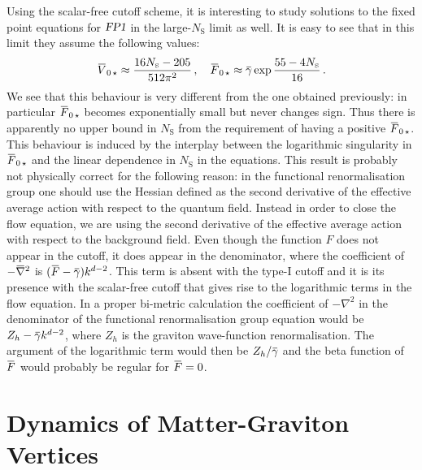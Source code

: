\documentclass[11pt]{book} %
\newcommand{\overbar}[1]{\mkern 1.5mu\overline{\mkern-1.5mu#1\mkern-1.5mu}\mkern 1.5mu}
\newcommand\NS{ N_{\scriptscriptstyle{\mathrm{S}}} }
\newcommand{\bnabla}{\overbar \nabla}
\newcommand{\FPone}  {\textsl{FP1}}
\newcommand{\bV}{\overbar V}
\newcommand{\bF}{\overbar F}
\newcommand{\bg}{\overbar \gamma}
\numberwithin{equation}{chapter}
\begin{document}
Using the scalar-free cutoff scheme, it is interesting to study solutions to
the fixed point equations for $\FPone$ in the large-$\NS$ limit as well.
It is easy to see that in this limit they assume the following values:
\begin{align}
  \bV_{0 \, \star} \approx \frac{ 16 \NS - 205 }{ 512 \pi^2 } \,, \quad
  \bF_{0 \, \star} \approx \bg\exp{\frac{ 55 - 4 \NS }{16}} \,.
\end{align}
We see that this behaviour is very different from the one obtained previously:
in particular $\bF_{0 \, \star}$ becomes exponentially small but never changes sign.
Thus there is apparently no upper bound in $\NS$ from the requirement of having a positive $\bF_{0 \, \star}$.
This behaviour is induced by the interplay between the logarithmic singularity
in $\bF_{0 \, \star}$ and the linear dependence in $\NS$ in the equations.
This result is probably not physically correct for the following
reason: in the functional renormalisation group one should use the Hessian defined as the second
derivative of the effective average action with respect to the quantum field.
Instead in order to close the flow equation,
we are using the second derivative of the
effective average action with respect to the background field.
Even though the function $F$ does not appear in the cutoff,
it does appear in the denominator, where the coefficient
of $-\bnabla^2$ is $(\bF-\bg) k^{d-2}$.
This term is absent with the type-I cutoff and
it is its presence with the scalar-free cutoff that gives rise
to the logarithmic terms in the flow equation.
In a proper bi-metric calculation the coefficient of
$-\nabla^2$ in the denominator of the functional renormalisation group equation
would be $Z_h-\bg k^{d-2}$, where $Z_h$ is the graviton
wave-function renormalisation.
The argument of the logarithmic term would then be $Z_h/\bg$
and the beta function of $\bF$ would probably be regular for $\bF=0$.




\chapter{Dynamics of Matter-Graviton Vertices}
\label{ch:astrid}
\end{document}
